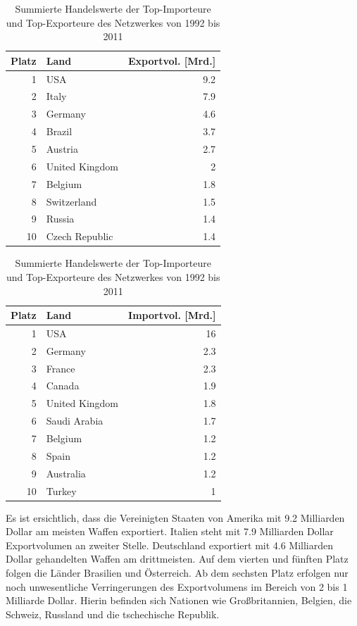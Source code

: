\documentclass[a4paper,ngerman,oneside,titlepage,bibliography=totoc,11pt]{scrreprt}
\begin{document}
\begin{table}[ht]

\centering

\begin{minipage}[t]{0.48\textwidth}
\footnotesize
\begin{tabular}{rlr}
  \hline
 Platz & Land & Exportvol. [Mrd.]\\ 
  \hline
1 & USA & 9.2\\ 
  2 & Italy & 7.9 \\ 
  3 & Germany & 4.6 \\ 
  4 & Brazil & 3.7 \\ 
  5 & Austria & 2.7 \\ 
  6 & United Kingdom & 2 \\ 
  7 & Belgium & 1.8 \\ 
  8 & Switzerland & 1.5 \\ 
  9 & Russia & 1.4 \\ 
  10 & Czech Republic & 1.4 \\ 
   \hline
	\end{tabular}
	\end{minipage}	
\hfill	
\begin{minipage}[t]{0.48\textwidth}	
\footnotesize
\begin{tabular}{rlr}
  \hline
 Platz & Land & Importvol. [Mrd.]\\ 
  \hline
1 & USA & 16\\ 
  2 & Germany & 2.3\\ 
  3 & France & 2.3\\ 
  4 & Canada & 1.9 \\ 
  5 & United Kingdom & 1.8\\  
  6 & Saudi Arabia & 1.7\\ 
  7 & Belgium & 1.2\\ 
  8 & Spain & 1.2\\ 
  9 & Australia & 1.2\\ 
  10 & Turkey & 1\\ 
   \hline
\end{tabular}
\end{minipage}
\caption{Summierte Handelswerte der Top-Importeure und Top-Exporteure des Netzwerkes von 1992 bis 2011}
\label{tab:tops1}
\end{table}


Es ist ersichtlich, dass die Vereinigten Staaten von Amerika mit 9.2 Milliarden Dollar am meisten Waffen exportiert. Italien steht mit 7.9 Milliarden Dollar Exportvolumen an zweiter Stelle. Deutschland exportiert mit 4.6 Milliarden Dollar gehandelten Waffen am drittmeisten. Auf dem vierten und fünften Platz folgen die Länder Brasilien und Österreich. Ab dem sechsten Platz erfolgen nur noch unwesentliche Verringerungen des Exportvolumens im Bereich von 2 bis 1 Milliarde Dollar. Hierin befinden sich Nationen wie Großbritannien, Belgien, die Schweiz, Russland und die tschechische Republik. 
\end{document}
